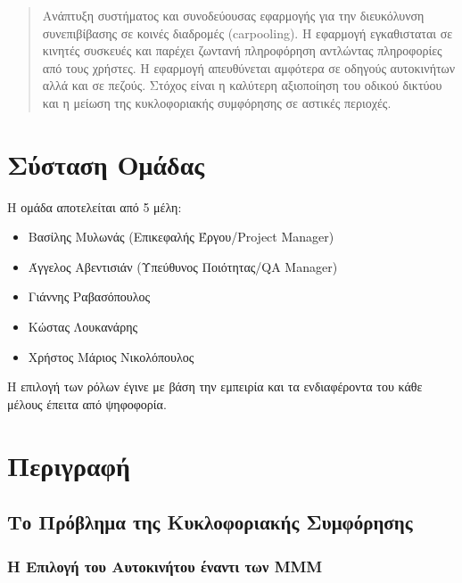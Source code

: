 \documentclass[11pt]{article}
\begin{document}

\newpage

\begin{abstract}
    Ανάπτυξη συστήματος και συνοδεύουσας εφαρμογής για την διευκόλυνση
    συνεπιβίβασης σε κοινές διαδρομές (carpooling).
    Η εφαρμογή εγκαθισταται σε κινητές συσκευές και παρέχει ζωντανή πληροφόρηση
    αντλώντας πληροφορίες από τους χρήστες. H εφαρμογή απευθύνεται αμφότερα σε
    οδηγούς αυτοκινήτων αλλά και σε πεζούς. Στόχος είναι η καλύτερη αξιοποίηση
    του οδικού δικτύου και η μείωση της κυκλοφοριακής συμφόρησης σε αστικές
    περιοχές.
\end{abstract}

\newpage

\tableofcontents

\newpage

\section{Σύσταση Ομάδας}

Η ομάδα αποτελείται από 5 μέλη:

\begin{itemize}
    \item Βασίλης Μυλωνάς (Επικεφαλής Έργου/Project Manager)
    \item Άγγελος Αβεντισιάν (Υπεύθυνος Ποιότητας/QA Manager)
    \item Γιάννης Ραβασόπουλος
    \item Κώστας Λουκανάρης
    \item Χρήστος Μάριος Νικολόπουλος
\end{itemize}

Η επιλογή των ρόλων έγινε με βάση την εμπειρία και τα ενδιαφέροντα του κάθε
μέλους έπειτα από ψηφοφορία.

\newpage

\section{Περιγραφή}

\subsection{Το Πρόβλημα της Κυκλοφοριακής Συμφόρησης}

\subsubsection{Η Επιλογή του Αυτοκινήτου έναντι των ΜΜΜ}
\end{document}
